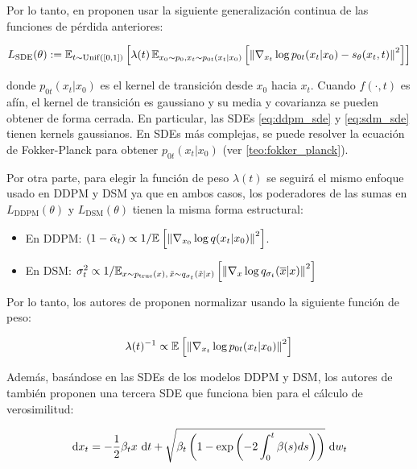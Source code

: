Por lo tanto, en \cite{song2021scorebased} proponen usar la siguiente generalización continua de las funciones de pérdida anteriores:

\begin{equation*}
    L_{\text{SDE}}(\theta) := \mathbb{E}_{t\sim\operatorname{Unif}([0,1])}\left[\lambda(t)\,\mathbb{E}_{x_0\sim p_0, x_t\sim p_{0t}(x_t|x_0)}\left[\left\lVert \nabla_{x_t} \log p_{0t}(x_t|x_0) - s_\theta(x_t,t) \right\rVert^2\right]\right]
\end{equation*}

donde $p_{0t}(x_t|x_0)$ es el kernel de transición desde $x_0$ hacia $x_t$. Cuando $f(\cdot,t)$ es afín, el kernel de transición es gaussiano y su media y covarianza se pueden obtener de forma cerrada. En particular, las SDEs \eqref{eq:ddpm_sde} y \eqref{eq:sdm_sde} tienen kernels gaussianos. En SDEs más complejas, se puede resolver la ecuación de Fokker-Planck para obtener $p_{0t}(x_t|x_0)$ (ver \autoref{teo:fokker_planck}).

Por otra parte, para elegir la función de peso $\lambda(t)$ se seguirá el mismo enfoque usado en DDPM y DSM ya que en ambos casos, los poderadores de las sumas en $L_{\text{DDPM}}(\theta)$ y $L_{\text{DSM}}(\theta)$ tienen la misma forma estructural:

\begin{itemize}
    \item En DDPM: $(1-\bar\alpha_t)\propto 1/\mathbb{E}_{}\left[\left\lVert \nabla_{x_0} \log q(x_t|x_0) \right\rVert^2\right]$.
    \item En DSM: $\sigma_t^2\propto 1/\mathbb{E}_{x\sim p_{\operatorname{true}}(x),\,\tilde{x}\sim q_{\sigma_t}(\tilde{x}|x)}\left[\left\lVert \nabla_{x} \log q_{\sigma_t}(\overline{x}|x) \right\rVert^2\right]$
\end{itemize}

Por lo tanto, los autores de \cite{song2021scorebased} proponen normalizar usando la siguiente función de peso:

\begin{equation*}
    \lambda(t)^{-1} \propto \mathbb{E}_{}\left[\left\lVert \nabla_{x_t} \log p_{0t}(x_t|x_0) \right\rVert^2\right]
\end{equation*}

Además, basándose en las SDEs de los modelos DDPM y DSM, los autores de \cite{song2021scorebased} también proponen una tercera SDE que funciona bien para el cálculo de verosimilitud:

\begin{equation*}
    \,\operatorname{d}\! x_t = -\frac{1}{2}\beta_t x \,\operatorname{d}\! t + \sqrt{\beta_t\left(1-\exp\left(-2\int_0^t \beta(s)ds\right)\right)}\,\operatorname{d}\! w_t
\end{equation*}

